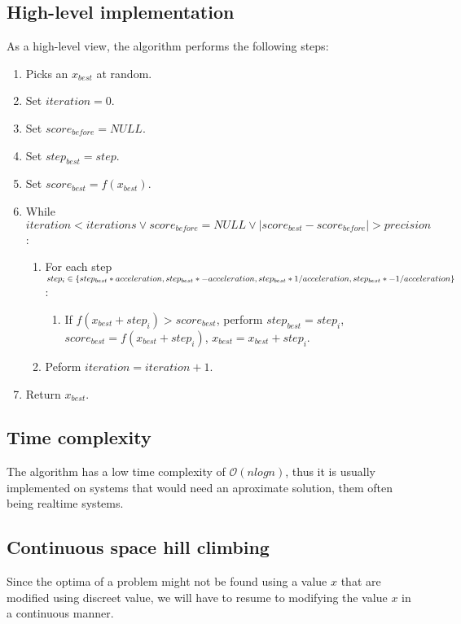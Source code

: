 \documentclass[conference]{IEEEtran}
\begin{document}
\subsection{High-level implementation}
As a high-level view, the algorithm performs the following steps:
\begin{enumerate}
    \item Picks an $x_{best}$ at random.
    \item Set $iteration = 0$.
    \item Set $score_{before} = NULL$.
    \item Set $step_{best} = step$.
    \item Set $score_{best} = f(x_{best})$.
    \item While $iteration < iterations \lor score_{before} = NULL \lor |score_{best} - score_{before}| > precision$:
    \begin{enumerate}
        \item For each step $step_i \in \{\\step_{best} * acceleration, \\step_{best} * -acceleration, \\step_{best} * 1 / acceleration, \\step_{best} * -1 / acceleration\\\}$:
        \begin{enumerate}
            \item If $f(x_{best} + step_i) > score_{best}$, perform $step_{best} = step_i$, $score_{best} = f(x_{best} + step_i)$, $x_{best} = x_{best} + step_i$.
        \end{enumerate} 
        \item Peform $iteration = iteration + 1$.
    \end{enumerate}
    \item Return $x_{best}$.
\end{enumerate}

\subsection{Time complexity}
The algorithm has a low time complexity of $\mathcal{O}(n log n)$, thus it is usually implemented on systems that would need an
aproximate solution, them often being realtime systems.

\subsection{Continuous space hill climbing}
Since the optima of a problem might not be found using a value $x$ that are modified using discreet value, we will have to resume
to modifying the value $x$ in a continuous manner.
\end{document}
